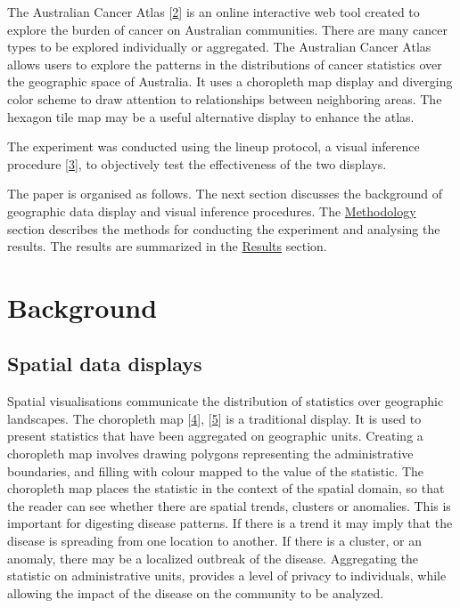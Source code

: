 \documentclass[conference,final,]{IEEEtran}
\begin{document}
The Australian Cancer Atlas {[}\protect\hyperlink{ref-atlas}{2}{]} is an online interactive web tool created to explore the burden of cancer on Australian communities. There are many cancer types to be explored individually or aggregated. The Australian Cancer Atlas allows users to explore the patterns in the distributions of cancer statistics over the geographic space of Australia. It uses a choropleth map display and diverging color scheme to draw attention to relationships between neighboring areas. The hexagon tile map may be a useful alternative display to enhance the atlas.

The experiment was conducted using the lineup protocol, a visual inference procedure {[}\protect\hyperlink{ref-GIIV}{3}{]}, to objectively test the effectiveness of the two displays.

The paper is organised as follows. The next section discusses the background of geographic data display and visual inference procedures. The \protect\hyperlink{methodology}{Methodology} section describes the methods for conducting the experiment and analysing the results. The results are summarized in the \protect\hyperlink{results}{Results} section.

\hypertarget{background}{%
\section{Background}\label{background}}

\hypertarget{spatial-data-displays}{%
\subsection{Spatial data displays}\label{spatial-data-displays}}

Spatial visualisations communicate the distribution of statistics over geographic landscapes. The choropleth map {[}\protect\hyperlink{ref-EI}{4}{]}, {[}\protect\hyperlink{ref-BCM}{5}{]} is a traditional display. It is used to present statistics that have been aggregated on geographic units. Creating a choropleth map involves drawing polygons representing the administrative boundaries, and filling with colour mapped to the value of the statistic. The choropleth map places the statistic in the context of the spatial domain, so that the reader can see whether there are spatial trends, clusters or anomalies. This is important for digesting disease patterns. If there is a trend it may imply that the disease is spreading from one location to another. If there is a cluster, or an anomaly, there may be a localized outbreak of the disease. Aggregating the statistic on administrative units, provides a level of privacy to individuals, while allowing the impact of the disease on the community to be analyzed.
\end{document}
